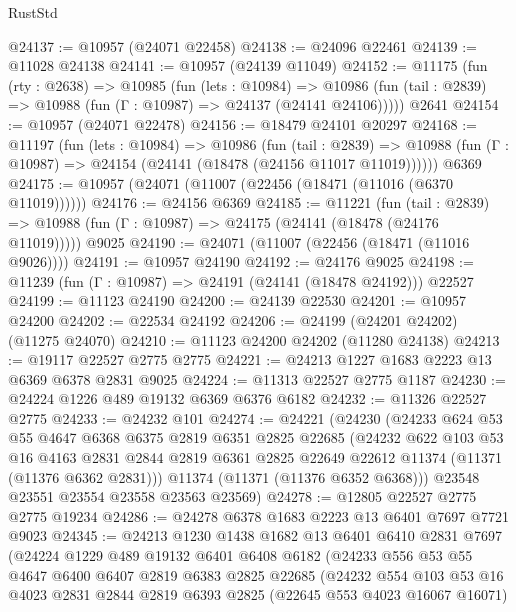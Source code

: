 \begin{lexlean}{RustStd}
\begin{coremodule}
@24137 := @10957 (@24071 @22458)
@24138 := @24096 @22461
@24139 := @11028 @24138
@24141 := @10957 (@24139 @11049)
@24152 := @11175
    (fun (rty : @2638) =>
    @10985
      (fun (lets : @10984) =>
      @10986 (fun (tail : @2839) => @10988 (fun (Γ : @10987) => @24137 (@24141 @24106)))))
    @2641
@24154 := @10957 (@24071 @22478)
@24156 := @18479 @24101 @20297
@24168 := @11197
    (fun (lets : @10984) =>
    @10986
      (fun (tail : @2839) =>
      @10988 (fun (Γ : @10987) => @24154 (@24141 (@18478 (@24156 @11017 @11019))))))
    @6369
@24175 := @10957 (@24071 (@11007 (@22456 (@18471 (@11016 (@6370 @11019))))))
@24176 := @24156 @6369
@24185 := @11221
    (fun (tail : @2839) => @10988 (fun (Γ : @10987) => @24175 (@24141 (@18478 (@24176 @11019)))))
    @9025
@24190 := @24071 (@11007 (@22456 (@18471 (@11016 @9026))))
@24191 := @10957 @24190
@24192 := @24176 @9025
@24198 := @11239 (fun (Γ : @10987) => @24191 (@24141 (@18478 @24192))) @22527
@24199 := @11123 @24190
@24200 := @24139 @22530
@24201 := @10957 @24200
@24202 := @22534 @24192
@24206 := @24199 (@24201 @24202) (@11275 @24070)
@24210 := @11123 @24200 @24202 (@11280 @24138)
@24213 := @19117 @22527 @2775 @2775
@24221 := @24213 @1227 @1683 @2223 @13 @6369 @6378 @2831 @9025
@24224 := @11313 @22527 @2775 @1187
@24230 := @24224 @1226 @489 @19132 @6369 @6376 @6182
@24232 := @11326 @22527 @2775
@24233 := @24232 @101
@24274 := @24221
    (@24230
      (@24233
        @624
        @53
        @55
        @4647
        @6368
        @6375
        @2819
        @6351
        @2825
        @22685
        (@24232
          @622
          @103
          @53
          @16
          @4163
          @2831
          @2844
          @2819
          @6361
          @2825
          @22649
          @22612
          @11374
          (@11371 (@11376 @6362 @2831)))
        @11374
        (@11371 (@11376 @6352 @6368)))
      @23548
      @23551
      @23554
      @23558
      @23563
      @23569)
@24278 := @12805 @22527 @2775 @2775 @19234
@24286 := @24278 @6378 @1683 @2223 @13 @6401 @7697 @7721 @9023
@24345 := @24213
    @1230
    @1438
    @1682
    @13
    @6401
    @6410
    @2831
    @7697
    (@24224
      @1229
      @489
      @19132
      @6401
      @6408
      @6182
      (@24233
        @556
        @53
        @55
        @4647
        @6400
        @6407
        @2819
        @6383
        @2825
        @22685
        (@24232
          @554
          @103
          @53
          @16
          @4023
          @2831
          @2844
          @2819
          @6393
          @2825
          (@22645 @553 @4023 @16067 @16071)

\end{coremodule}
\end{lexlean}
